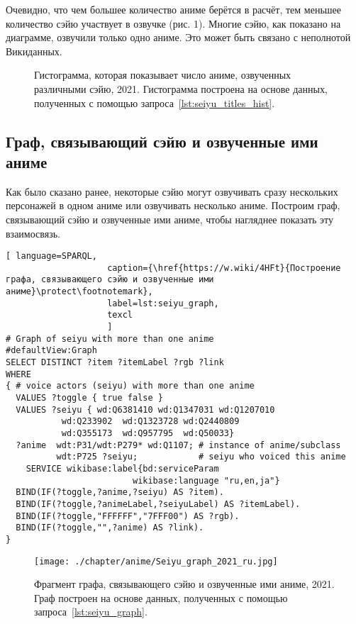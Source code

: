 Очевидно, что чем большее количество аниме берётся в расчёт, тем меньшее количество сэйю участвует в озвучке (рис. 1). Многие сэйю, как показано на диаграмме, озвучили только одно аниме. Это может быть связано с неполнотой Викиданных.

\begin{figure*}[h]

    \setlength{\fboxsep}{0pt}%
    \setlength{\fboxrule}{1pt}%
	\caption[Гистограмма, которая показывает число аниме, озвученных различными сэйю, 2021.]{Гистограмма, которая показывает число аниме, озвученных различными сэйю, 2021. Гистограмма построена на основе данных, полученных с помощью запроса~\protect\ref{lst:seiyu_titles_hist}.}%
    \label{fig:Seiyu_histogram_2021_ru}%
\end{figure*} 

\subsection{Граф, связывающий сэйю и озвученные ими аниме}

Как было сказано ранее, некоторые сэйю могут озвучивать сразу нескольких персонажей в одном аниме или озвучивать несколько аниме. Построим граф, связывающий сэйю и озвученные ими аниме, чтобы нагляднее показать эту взаимосвязь. 

\begin{lstlisting}[ language=SPARQL, 
                    caption={\href{https://w.wiki/4HFt}{Построение графа, связывающего сэйю и озвученные ими аниме}\protect\footnotemark},
                    label=lst:seiyu_graph,
                    texcl 
                    ]
# Graph of seiyu with more than one anime
#defaultView:Graph
SELECT DISTINCT ?item ?itemLabel ?rgb ?link
WHERE
{ # voice actors (seiyu) with more than one anime
  VALUES ?toggle { true false }
  VALUES ?seiyu { wd:Q6381410 wd:Q1347031 wd:Q1207010 
           wd:Q233902  wd:Q1323728 wd:Q2440809 
           wd:Q355173  wd:Q957795  wd:Q50033}
  ?anime  wdt:P31/wdt:P279* wd:Q1107; # instance of anime/subclass
          wdt:P725 ?seiyu;            # seiyu who voiced this anime 
    SERVICE wikibase:label{bd:serviceParam
					     wikibase:language "ru,en,ja"}
  BIND(IF(?toggle,?anime,?seiyu) AS ?item).
  BIND(IF(?toggle,?animeLabel,?seiyuLabel) AS ?itemLabel).
  BIND(IF(?toggle,"FFFFFF","7FFF00") AS ?rgb).
  BIND(IF(?toggle,"",?anime) AS ?link).
}
\end{lstlisting}%

\begin{figure*}[h]
\centering
	\texttt{[image: ./chapter/anime/Seiyu\_graph\_2021\_ru.jpg]}
	\caption[Фрагмент графа, связывающего сэйю и озвученные ими аниме, 2021.]{Фрагмент графа, связывающего сэйю и озвученные ими аниме, 2021. Граф построен на основе данных, полученных с помощью запроса~\protect\ref{lst:seiyu_graph}.}%
      \label{fig:Seiyu_graph_2021_ru}%
\end{figure*} 
